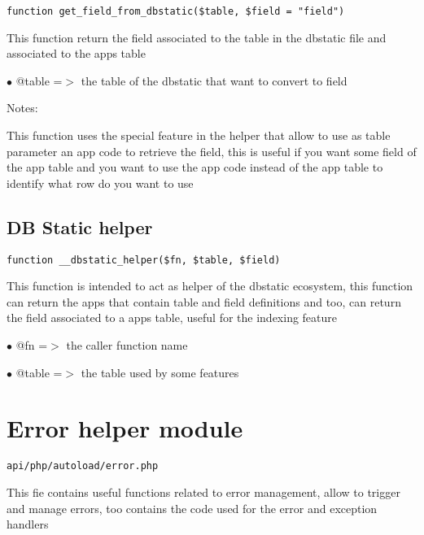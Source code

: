 \documentclass[a4paper]{book}
\begin{document}
\begin{lstlisting}
function get_field_from_dbstatic($table, $field = "field")
\end{lstlisting}

This function return the field associated to the table in the dbstatic
file and associated to the apps table

\begin{compactitem}
\item[\color{myblue}$\bullet$] @table =$>$ the table of the dbstatic that want to convert to field
\end{compactitem}

Notes:

This function uses the special feature in the helper that allow to
use as table parameter an app code to retrieve the field, this is
useful if you want some field of the app table and you want to use
the app code instead of the app table to identify what row do you
want to use

\hypertarget{toc102}{}
\subsection{DB Static helper}

\begin{lstlisting}
function __dbstatic_helper($fn, $table, $field)
\end{lstlisting}

This function is intended to act as helper of the dbstatic ecosystem, this
function can return the apps that contain table and field definitions and
too, can return the field associated to a apps table, useful for the
indexing feature

\begin{compactitem}
\item[\color{myblue}$\bullet$] @fn    =$>$ the caller function name
\item[\color{myblue}$\bullet$] @table =$>$ the table used by some features
\end{compactitem}

\hypertarget{toc103}{}
\section{Error helper module}

\begin{lstlisting}
api/php/autoload/error.php
\end{lstlisting}

This fie contains useful functions related to error management, allow to trigger and manage
errors, too contains the code used for the error and exception handlers
\end{document}
